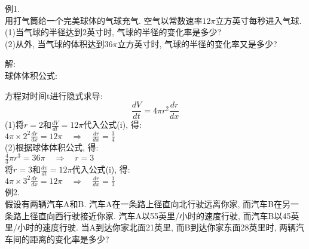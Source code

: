 \documentclass[UTF8, fontset=ubuntu, fleqn]{ctexart}
\begin{document}
例1.\\
用打气筒给一个完美球体的气球充气. 空气以常数速率$12\pi$立方英寸每秒进入气球.\\
(1)当气球的半径达到$2$英寸时, 气球的半径的变化率是多少?\\
(2)从外, 当气球的体积达到$36\pi$立方英寸时, 气球的半径的变化率又是多少?

解:\\
球体体积公式:\\[-2ex]
\begin{center}
\end{center}
方程对时间t进行隐式求导:
\begin{equation}
\displaystyle\frac{dV}{dt}=4\pi r^2\frac{dr}{dx}
\end{equation}
(1)将$r=2$和$\frac{dV}{dt}=12\pi$代入公式(i), 得:\\[1ex]
\phantom{(1)}$\displaystyle 4\pi\times 2^2\frac{dr}{dx}=12\pi\quad\Rightarrow\quad\frac{dr}{dx}=\frac{3}{4}$\\[1ex]
(2)根据球体体积公式, 得:\\[1ex]
\phantom{(2)}$\displaystyle\frac{4}{3}\pi r^3=36\pi\quad\Rightarrow\quad r=3$\\[1ex]
\phantom{(2)}将$r=3$和$\frac{dv}{dt}=12\pi$代入公式(i), 得:\\[1ex]
\phantom{(2)}$\displaystyle 4\pi\times 3^2\frac{dr}{dx}=12\pi\quad\Rightarrow\quad\frac{dr}{dx}=\frac{1}{3}$\\[2ex]

例2.\\
假设有两辆汽车A和B. 汽车A在一条路上径直向北行驶远离你家, 而汽车B在另一条路上径直向西行驶接近你家. 汽车A以55英里/小时的速度行驶, 而汽车B以45英里/小时的速度行驶. 当A到达你家北面21英里, 而B到达你家东面28英里时, 两辆汽车间的距离的变化率是多少?
\end{document}
